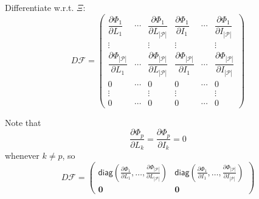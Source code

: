 \documentclass[aspectratio=169]{beamer}\usepackage[]{graphicx}\usepackage[]{xcolor}
\begin{document}
\begin{frame}
Differentiate w.r.t. $\Xi$:
$$
D\mathcal{F}
=
\begin{pmatrix}
\dfrac{\partial\Phi_1}{\partial L_1} & \cdots &
\dfrac{\partial\Phi_1}{\partial L_{|\mathcal{P}|}} & 
\dfrac{\partial\Phi_1}{\partial I_1} & \cdots &
\dfrac{\partial\Phi_1}{\partial I_{|\mathcal{P}|}} \\
\vdots & & \vdots & \vdots & & \vdots \\
\dfrac{\partial\Phi_{|\mathcal{P}|}}{\partial L_1} & \cdots &
\dfrac{\partial\Phi_{|\mathcal{P}|}}{\partial L_{|\mathcal{P}|}} & 
\dfrac{\partial\Phi_{|\mathcal{P}|}}{\partial I_1} & \cdots &
\dfrac{\partial\Phi_{|\mathcal{P}|}}{\partial I_{|\mathcal{P}|}} \\
0 & \cdots & 0 & 0 & \cdots & 0 \\
\vdots & & \vdots & \vdots & & \vdots \\
0 & \cdots & 0 & 0 & \cdots & 0
\end{pmatrix}
$$
\end{frame}

\begin{frame}
Note that
$$
\frac{\partial\Phi_p}{\partial L_k}=\frac{\partial\Phi_p}{\partial I_k}=0
$$
whenever $k\neq p$, so
$$
D\mathcal{F}
=
\begin{pmatrix}
\mathsf{diag}\left(
\frac{\partial\Phi_1}{\partial L_1},\ldots,\frac{\partial\Phi_{|\mathcal{P}|}}{\partial L_{|\mathcal{P}|}}\right) &
\mathsf{diag}\left(
\frac{\partial\Phi_1}{\partial I_1},\ldots,\frac{\partial\Phi_{|\mathcal{P}|}}{\partial I_{|\mathcal{P}|}}\right) \\
\mathbf{0} & \mathbf{0} 
\end{pmatrix}
$$
\end{frame}
\end{document}
